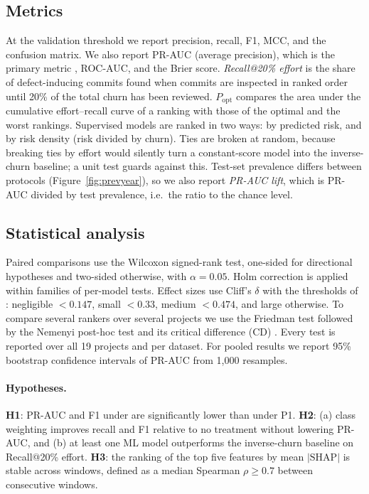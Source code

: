 \subsection{Metrics}\label{sec:metrics}

At the validation threshold we report precision, recall, F1, MCC, and the confusion matrix. We also report PR-AUC (average precision), which is the primary metric \citep{saito2015}, ROC-AUC, and the Brier score. \emph{Recall@20\% effort} is the share of defect-inducing commits found when commits are inspected in ranked order until 20\% of the total churn has been reviewed. $P_{\text{opt}}$ \citep{kamei2013} compares the area under the cumulative effort--recall curve of a ranking with those of the optimal and the worst rankings. Supervised models are ranked in two ways: by predicted risk, and by risk density (risk divided by churn). Ties are broken at random, because breaking ties by effort would silently turn a constant-score model into the inverse-churn baseline; a unit test guards against this. Test-set prevalence differs between protocols (Figure~\ref{fig:prevyear}), so we also report \emph{PR-AUC lift}, which is PR-AUC divided by test prevalence, i.e.\ the ratio to the chance level.

\subsection{Statistical analysis}\label{sec:stats}

Paired comparisons use the Wilcoxon signed-rank test, one-sided for directional hypotheses and two-sided otherwise, with $\alpha=0.05$. Holm correction \citep{holm1979} is applied within families of per-model tests. Effect sizes use Cliff's $\delta$ with the thresholds of \citet{romano2006}: negligible $<0.147$, small $<0.33$, medium $<0.474$, and large otherwise. To compare several rankers over several projects we use the Friedman test followed by the Nemenyi post-hoc test and its critical difference (CD) \citep{demsar2006}. Every test is reported over all 19 projects and per dataset. For pooled results we report 95\% bootstrap confidence intervals of PR-AUC from 1{,}000 resamples.

\paragraph{Hypotheses.}
\textbf{H1}: PR-AUC and F1 under \pthree{} are significantly lower than under P1.
\textbf{H2}: (a) class weighting improves recall and F1 relative to no treatment without lowering PR-AUC, and (b) at least one ML model outperforms the inverse-churn baseline on Recall@20\% effort.
\textbf{H3}: the ranking of the top five features by mean $|\text{SHAP}|$ is stable across windows, defined as a median Spearman $\rho\ge0.7$ between consecutive windows.

